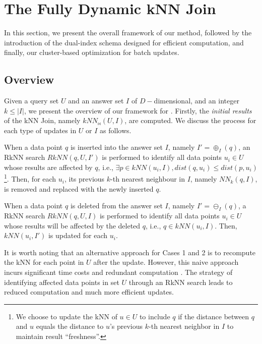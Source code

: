 \section{The Fully Dynamic kNN Join}\label{sec:fdknnj}

In this section, we present the overall framework of our method, followed by the introduction of the dual-index schema designed for efficient computation, and finally, our cluster-based optimization for batch updates.

\subsection{Overview}\label{subsec:general analysis}

Given a query set $U$ and an answer set $I$ of $D-$dimensional, and an integer $k\leq|I|$, we present the overview of our framework for \fdknnj.
%
Firstly, the \emph{initial results} of the kNN Join, namely $kNN_{\bowtie}(U,I)$, are computed.
%
We discuss the process for each type of updates in $U$ or $I$ as follows.


%
When a data point $q$ is inserted into the answer set $I$, namely $I'=\oplus_I(q)$, an RkNN search $RkNN(q,U,I')$ is performed to identify all data points $u_i\in U$ whose results are affected by $q$, i.e., $\exists p\in kNN(u_i,I), dist(q,u_i)\leq dist(p, u_i)$\footnote{We choose to update the kNN of $u\in U$ to include $q$ if the distance between $q$ and $u$ equals the distance to $u$'s previous $k$-th nearest neighbor in $I$ to maintain result ``freshness''.}.
%
Then, for each $u_i$, its previous $k$-th nearest neighbour in $I$, namely $NN_k(q,I)$, is removed and replaced with the newly inserted $q$. 

%
When a data point $q$ is deleted from the answer set $I$, namely $I'=\ominus_I(q)$, a RkNN search $RkNN(q,U,I)$ is performed to identify all data points $u_i\in U$ whose results will be affected by the deleted $q$, i.e., $q\in kNN(u_i,I)$.
%
Then, $kNN(u_i, I')$ is updated for each $u_i$.

\begin{remark}
It is worth noting that an alternative approach for Cases 1 and 2 is to recompute the kNN for each point in $U$ after the update.
%
However, this naive approach incurs significant time costs and redundant computation \cite{yang2014continuous,ukey2022efficient, yu2010high, ukey2023efficient}. 
%
The strategy of identifying affected data points in set $U$ through an RkNN search leads to reduced computation and much more efficient updates.
\end{remark}

